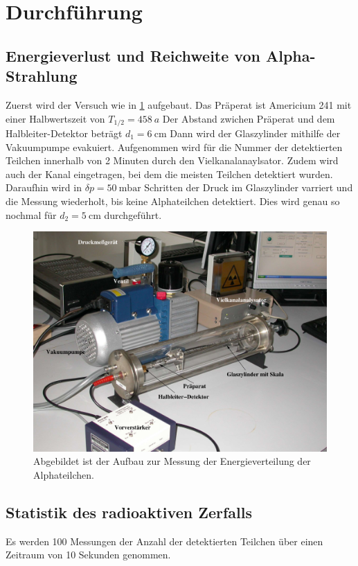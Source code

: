 

\section{Durchführung}
\label{sec:Durchführung}
\subsection{Energieverlust und Reichweite von Alpha-Strahlung}
Zuerst wird der Versuch wie in \ref{fig:Aufbau} aufgebaut.
Das Präperat ist Americium 241 mit einer Halbwertszeit von $T_{1/2}=\qty{458}{a}$
Der Abstand zwichen Präperat und dem Halbleiter-Detektor beträgt $d_1=\qty{6}{\centi\meter}$
Dann wird der Glaszylinder mithilfe der Vakuumpumpe evakuiert.
Aufgenommen wird für die Nummer der detektierten Teilchen innerhalb von 2 Minuten durch den Vielkanalanaylsator.
Zudem wird auch der Kanal eingetragen, bei dem die meisten Teilchen detektiert wurden.
Daraufhin wird in $\delta p=\qty{50}{\milli\bar}$ Schritten der Druck im Glaszylinder varriert und die Messung wiederholt, bis keine Alphateilchen detektiert.
Dies wird genau so nochmal für $d_2=\qty{5}{\centi\meter}$ durchgeführt.

\begin{figure}
    \centering
    \includegraphics[width=\textwidth]{Bilder/Aufbau.png}
    \caption{Abgebildet ist der Aufbau zur Messung der Energieverteilung der Alphateilchen.}
    \label{fig:Aufbau}
\end{figure}

\subsection{Statistik des radioaktiven Zerfalls}
Es werden 100 Messungen der Anzahl der detektierten Teilchen über einen Zeitraum von 10 Sekunden genommen.